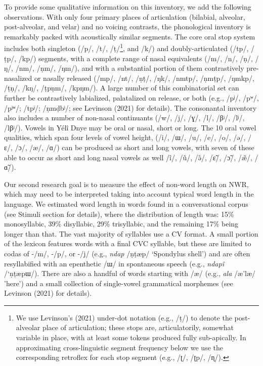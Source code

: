 \documentclass[
  american,
  ,man,floatsintext]{apa6}
\begin{document}
To provide some qualitative information on this inventory, we add the following observations. With only four primary places of articulation (bilabial, alveolar, post-alveolar, and velar) and no voicing contrasts, the phonological inventory is remarkably packed with acoustically similar segments. The core oral stop system includes both singleton (/p/, /t/, /ṭ/\footnote{We use Levinson's (2021) under-dot notation (e.g., /ṭ/) to denote the post-alveolar place of articulation; these stops are, articulatorily, somewhat variable in place, with at least some tokens produced fully sub-apically. In approximating cross-linguistic segment frequency below we use the corresponding retroflex for each stop segment (e.g., /ʈ/, /ʈp/, /ɳ/).}, and /k/) and doubly-articulated (/tp/, /ṭp/, /kp/) segments, with a complete range of nasal equivalents (/m/, /n/, /ṇ/, /ŋ/, /nm/, /ṇm/, /ŋm/), and with a substantial portion of them contrastively pre-nasalized or nasally released (/mp/, /nt/, /ṇṭ/, /ŋk/, /nmtp/, /ṇmṭp/, /ŋmkp/, /ṭṇ/, /kŋ/, /ṭpṇm/, /kpŋm/). A large number of this combinatorial set can further be contrastively labialized, palatalized on release, or both (e.g., /pʲ/, /pʷ/, /pʲʷ/; /tpʲ/; /ṇmḍbʲ/; see Levinson (2021) for details). The consonantal inventory also includes a number of non-nasal continuants (/w/, /j/, /ɣ/, /l/, /βʲ/, /lʲ/, /lβʲ/). Vowels in Yélî Dnye may be oral or nasal, short or long. The 10 oral vowel qualities, which span four levels of vowel height, (/i/, /ɯ/, /u/, /e/, /o/, /ə/, /ɛ/, /ɔ/, /æ/, /ɑ/) can be produced as short and long vowels, with seven of these able to occur as short and long nasal vowels as well /ĩ/, /ũ/, /ə̃/, /ɛ̃/, /ɔ̃/, /æ̃/, /ɑ̃/).

Our second research goal is to measure the effect of non-word length on NWR, which may need to be interpreted taking into account typical word length in the language.
We estimated word length in words found in a conversational corpus (see Stimuli section for details), where the distribution of length was: 15\% monosyllabic, 39\% disyllabic, 29\% trisyllabic, and the remaining 17\% being longer than that. The vast majority of syllables use a CV format. A small portion of the lexicon features words with a final CVC syllable, but these are limited to codas of -/m/, -/p/, or -/j/ (e.g., \emph{ndap} /ṇṭæp/ `Spondylus shell') and are often resyllabified with an epenthetic /ɯ/ in spontaneous speech (e.g., \emph{ndapî} /`ṇṭæpɯ/). There are also a handful of words starting with /æ/ (e.g., \emph{ala} /æ'læ/ 'here') and a small collection of single-vowel grammatical morphemes (see Levinson (2021) for details).
\end{document}
